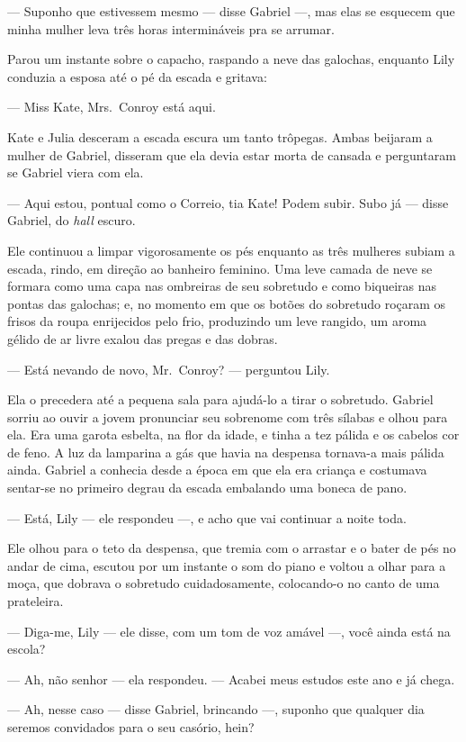 --- Suponho que estivessem mesmo --- disse Gabriel ---, mas elas se esquecem
que minha mulher leva três horas intermináveis pra se arrumar.

Parou um instante sobre o capacho, raspando a neve das galochas, enquanto Lily
conduzia a esposa até o pé da escada e gritava:

--- Miss Kate, Mrs.~Conroy está aqui.

Kate e Julia desceram a escada escura um tanto trôpegas.  Ambas beijaram a
mulher de Gabriel, disseram que ela devia estar morta de cansada e perguntaram
se Gabriel viera com ela.

--- Aqui estou, pontual como o Correio, tia Kate!  Podem subir.  Subo já ---
disse Gabriel, do \textit{hall} escuro.

Ele continuou a limpar vigorosamente os pés enquanto as três mulheres subiam a
escada, rindo, em direção ao banheiro feminino.  Uma leve camada de neve se
formara como uma capa nas ombreiras de seu sobretudo e como biqueiras nas
pontas das galochas; e, no momento em que os botões do sobretudo roçaram os
frisos da roupa enrijecidos pelo frio, produzindo um leve rangido, um aroma
gélido de ar livre exalou das pregas e das dobras.

--- Está nevando de novo, Mr.~Conroy? --- perguntou Lily.

Ela o precedera até a pequena sala para ajudá-lo a tirar o sobretudo.  Gabriel
sorriu ao ouvir a jovem pronunciar seu sobrenome com três sílabas e olhou para
ela.  Era uma garota esbelta, na flor da idade, e tinha a tez pálida e os
cabelos cor de feno.  A luz da lamparina a gás que havia na despensa tornava-a
mais pálida ainda.  Gabriel a conhecia desde a época em que ela era criança e
costumava sentar-se no primeiro degrau da escada embalando uma boneca de pano.

--- Está, Lily --- ele respondeu ---, e acho que vai continuar a noite toda.

Ele olhou para o teto da despensa, que tremia com o arrastar e o bater de pés no
andar de cima, escutou por um instante o som do piano e voltou a olhar para a
moça, que dobrava o sobretudo cuidadosamente, colocando-o no canto de uma
prateleira.

--- Diga-me, Lily --- ele disse, com um tom de voz amável ---, você ainda está
na escola?

--- Ah, não senhor --- ela respondeu.  --- Acabei meus estudos este ano e já
chega.

--- Ah, nesse caso --- disse Gabriel, brincando ---, suponho que qualquer dia
seremos convidados para o seu casório, hein?

